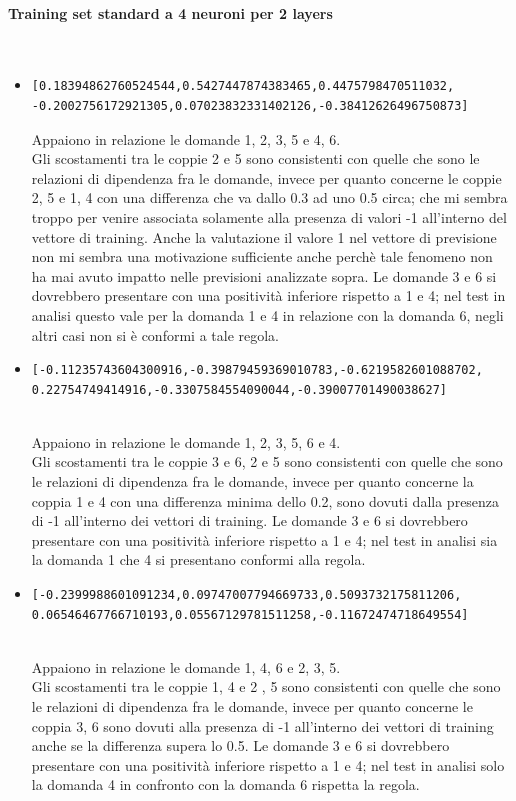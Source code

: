 \paragraph{Training set standard a 4 neuroni per 2 layers}\mbox{}
\label{Training set standard su rete a 4 neuroni}
\\
\noindent
\begin{itemize}
\item \begin{verbatim}[0.18394862760524544,0.5427447874383465,0.4475798470511032,
-0.2002756172921305,0.07023832331402126,-0.38412626496750873] \end{verbatim}
Appaiono in relazione le domande 1, 2, 3, 5 e 4, 6.\\
Gli scostamenti tra le coppie 2 e 5 sono consistenti con quelle che sono le relazioni  di dipendenza fra le domande, invece per quanto concerne le coppie 2, 5 e 1, 4 con una differenza che va dallo 0.3 ad uno 0.5 circa; che mi sembra troppo per venire associata solamente alla presenza di valori -1 all'interno del vettore di training. Anche la valutazione il valore 1 nel vettore di previsione non mi sembra una motivazione sufficiente anche perch\`e tale fenomeno non ha mai avuto impatto nelle previsioni analizzate sopra.
Le domande 3 e 6 si dovrebbero presentare con una positivit\`a inferiore rispetto a 1 e 4; nel test in analisi questo vale per la domanda 1 e 4 in relazione con la domanda 6, negli altri casi non si \`e conformi a tale regola.

\item \begin{verbatim}[-0.11235743604300916,-0.39879459369010783,-0.6219582601088702,
0.22754749414916,-0.3307584554090044,-0.39007701490038627] \end{verbatim}\\
Appaiono in relazione le domande 1, 2, 3, 5, 6 e 4.\\
Gli scostamenti tra le coppie 3 e 6, 2 e 5 sono consistenti con quelle che sono le relazioni di dipendenza fra le domande, invece per quanto concerne la coppia 1 e 4 con una differenza minima dello 0.2, sono dovuti dalla presenza di -1  all'interno dei vettori di training.
Le domande 3 e 6 si dovrebbero presentare con una positivit\`a inferiore rispetto a 1 e 4; nel test in analisi sia la domanda 1 che 4 si presentano conformi alla regola.

\item \begin{verbatim}[-0.2399988601091234,0.09747007794669733,0.5093732175811206,
0.06546467766710193,0.05567129781511258,-0.11672474718649554]\end{verbatim}\\
Appaiono in relazione le domande 1, 4, 6 e 2, 3, 5.\\
Gli scostamenti tra le  coppie 1, 4 e 2 , 5 sono consistenti con quelle che sono le relazioni di dipendenza fra le domande, invece per quanto concerne le coppia 3, 6 sono dovuti alla presenza di -1 all'interno dei vettori di training anche se la differenza supera lo 0.5.
Le domande 3 e 6 si dovrebbero presentare con una positivit\`a inferiore rispetto a 1 e 4; nel test in analisi solo la domanda 4 in confronto con la domanda 6 rispetta la regola.


\end{itemize}
